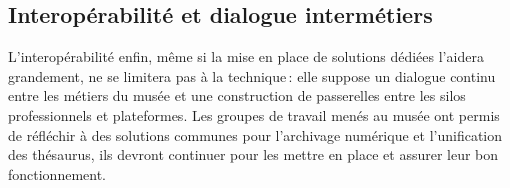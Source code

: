 \subsection{Interopérabilité et dialogue intermétiers}

L’interopérabilité enfin, même si la mise en place de solutions dédiées l'aidera grandement, ne se limitera pas à la technique : elle suppose un dialogue continu entre les métiers du musée et une construction de passerelles entre les silos professionnels et plateformes. Les groupes de travail menés au musée ont permis de réfléchir à des solutions communes pour l’archivage numérique et l'unification des thésaurus, ils devront continuer pour les mettre en place et assurer leur bon fonctionnement. 
